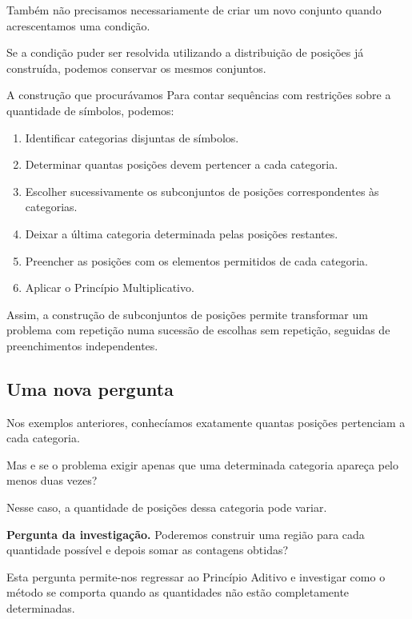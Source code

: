 \documentclass[11pt,a4paper,oneside]{book}
\newcommand{\Pergunta}[1]{\begin{perguntabox}\textbf{Pergunta da investigação.} #1\end{perguntabox}}
\begin{document}
Também não precisamos
necessariamente de criar
um novo conjunto quando
acrescentamos uma condição.

Se a condição puder ser
resolvida utilizando a
distribuição de posições
já construída, podemos
conservar os mesmos conjuntos.

\begin{descobertabox}{A construção que procurávamos}
Para contar sequências
com restrições sobre
a quantidade de símbolos,
podemos:

\begin{enumerate}
\item Identificar categorias
disjuntas de símbolos.

\item Determinar quantas posições
devem pertencer a cada categoria.

\item Escolher sucessivamente
os subconjuntos de posições
correspondentes às categorias.

\item Deixar a última categoria
determinada pelas posições restantes.

\item Preencher as posições
com os elementos permitidos
de cada categoria.

\item Aplicar o Princípio Multiplicativo.
\end{enumerate}

Assim, a construção de subconjuntos
de posições permite transformar
um problema com repetição
numa sucessão de escolhas
sem repetição, seguidas
de preenchimentos independentes.
\end{descobertabox}

\subsection*{Uma nova pergunta}

Nos exemplos anteriores,
conhecíamos exatamente
quantas posições pertenciam
a cada categoria.

Mas e se o problema exigir
apenas que uma determinada
categoria apareça pelo
menos duas vezes?

Nesse caso, a quantidade
de posições dessa categoria
pode variar.

\Pergunta{Poderemos construir
uma região para cada quantidade
possível e depois somar
as contagens obtidas?}

Esta pergunta permite-nos
regressar ao Princípio Aditivo
e investigar como o método
se comporta quando as
quantidades não estão
completamente determinadas.
\end{document}
